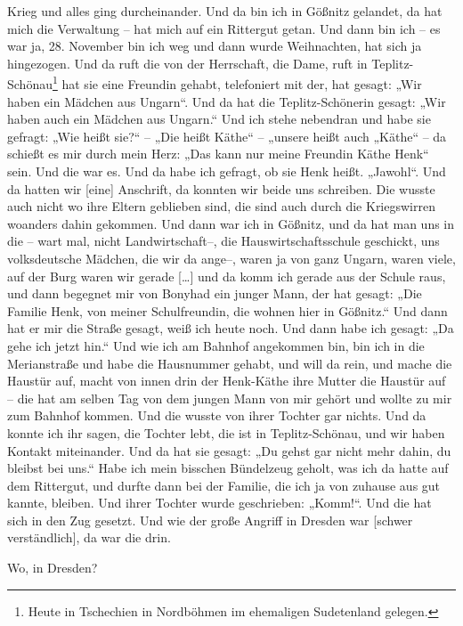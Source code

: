 \documentclass[ngerman,]{article}
\providecommand{\tightlist}{%
  \setlength{\itemsep}{0pt}\setlength{\parskip}{0pt}}
\begin{document}
\begin{multicols}{3}
\begin{description}
Krieg und alles ging durcheinander. Und da bin ich in Gößnitz gelandet,
da hat mich die Verwaltung – hat mich auf ein Rittergut getan. Und dann
bin ich – es war ja, 28. November bin ich weg und dann wurde
Weihnachten, hat sich ja hingezogen. Und da ruft die von der Herrschaft,
die Dame, ruft in Teplitz-Schönau\footnote{Heute in Tschechien in
  Nordböhmen im ehemaligen Sudetenland gelegen.} hat sie eine Freundin
gehabt, telefoniert mit der, hat gesagt: „Wir haben ein Mädchen aus
Ungarn“. Und da hat die Teplitz-Schönerin gesagt: „Wir haben auch ein
Mädchen aus Ungarn.“ Und ich stehe nebendran und habe sie gefragt: „Wie
heißt sie?“ – „Die heißt Käthe“ – „unsere heißt auch „Käthe“ – da
schießt es mir durch mein Herz: „Das kann nur meine Freundin Käthe Henk“
sein. Und die war es. Und da habe ich gefragt, ob sie Henk heißt.
„Jawohl“. Und da hatten wir {[}eine{]} Anschrift, da konnten wir beide
uns schreiben. Die wusste auch nicht wo ihre Eltern geblieben sind, die
sind auch durch die Kriegswirren woanders dahin gekommen. Und dann war
ich in Gößnitz, und da hat man uns in die – wart mal, nicht
Landwirtschaft–, die Hauswirtschaftsschule geschickt, uns volksdeutsche
Mädchen, die wir da ange–, waren ja von ganz Ungarn, waren viele, auf
der Burg waren wir gerade {[}\ldots{}{]} und da komm ich gerade aus der
Schule raus, und dann begegnet mir von Bonyhad ein junger Mann, der hat
gesagt: „Die Familie Henk, von meiner Schulfreundin, die wohnen hier in
Gößnitz.“ Und dann hat er mir die Straße gesagt, weiß ich heute noch.
Und dann habe ich gesagt: „Da gehe ich jetzt hin.“ Und wie ich am
Bahnhof angekommen bin, bin ich in die Merianstraße und habe die
Hausnummer gehabt, und will da rein, und mache die Haustür auf, macht
von innen drin der Henk-Käthe ihre Mutter die Haustür auf – die hat am
selben Tag von dem jungen Mann von mir gehört und wollte zu mir zum
Bahnhof kommen. Und die wusste von ihrer Tochter gar nichts. Und da
konnte ich ihr sagen, die Tochter lebt, die ist in Teplitz-Schönau, und
wir haben Kontakt miteinander. Und da hat sie gesagt: „Du gehst gar
nicht mehr dahin, du bleibst bei uns.“ Habe ich mein bisschen Bündelzeug
geholt, was ich da hatte auf dem Rittergut, und durfte dann bei der
Familie, die ich ja von zuhause aus gut kannte, bleiben. Und ihrer
Tochter wurde geschrieben: „Komm!“. Und die hat sich in den Zug gesetzt.
Und wie der große Angriff in Dresden war {[}schwer verständlich{]}, da
war die drin.
\end{description}

\begin{description}
\tightlist
\item[Ruth]
Wo, in Dresden?
\end{description}


\end{multicols}
\end{document}
